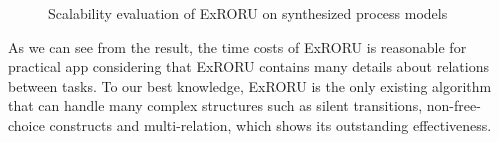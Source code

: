 \documentclass{llncs}
\begin{document}
\begin{figure}[htbp]
\centering
{}
\caption[Scalability evaluation of ExRORU]{Scalability evaluation of ExRORU on synthesized process models \label{fig:scalability}}
\end{figure}

As we can see from the result, the time costs of ExRORU is reasonable for practical app considering that ExRORU contains many details about relations between tasks. To our best knowledge, ExRORU is the only existing algorithm that can handle many complex structures such as silent transitions, non-free-choice constructs and multi-relation, which shows its outstanding effectiveness.
\end{document}
